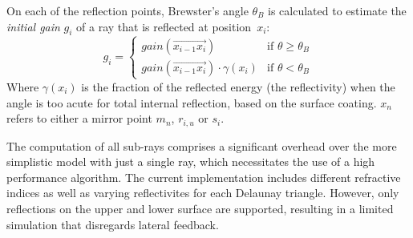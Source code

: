 On each of the reflection points, Brewster's angle $\theta_{B}$ is calculated to
estimate the \emph{initial gain} $g_i$ of a ray that is reflected at position~$x_i$:
\begin{equation}
\label{eq:gain_reflection}
  g_i = 
  \begin{cases}
    gain(\overrightarrow{x_{i-1}x_i}) & \text{if } \theta \ge \theta_{B}  \\
    gain(\overrightarrow{x_{i-1}x_i}) \cdot \gamma(x_i) & \text{if } \theta < \theta_{B}   
  \end{cases}
\end{equation}
Where $\gamma(x_i)$ is the fraction of the reflected energy (the reflectivity)
when the angle is too acute for total internal reflection, based on the surface
coating. $x_n$ refers to
either a mirror point $m_n$, $r_{i,u}$ or $s_i$.

The computation of all sub-rays comprises a significant overhead over the more
simplistic model with just a single ray, which necessitates the use of a high
performance algorithm.  The current implementation includes different refractive
indices as well as varying reflectivites for each Delaunay triangle. However,
only reflections on the upper and lower surface are supported, resulting in a
limited simulation that disregards lateral feedback. 

